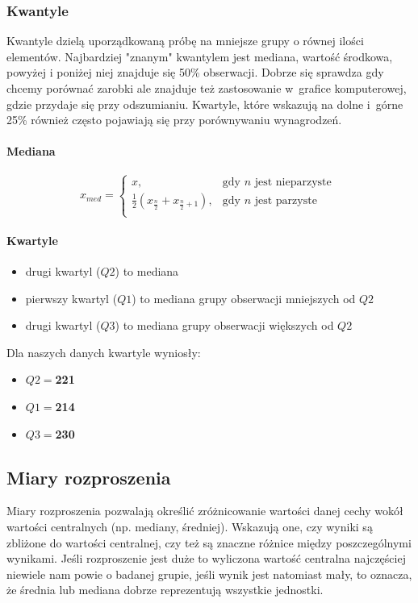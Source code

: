 \documentclass{article}
\theoremstyle{break}
\begin{document}
	\subsubsection*{Kwantyle}
	Kwantyle dzielą uporządkowaną próbę na mniejsze grupy o równej ilości elementów. Najbardziej "znanym" kwantylem jest mediana, wartość środkowa, powyżej i poniżej niej znajduje się 50\% obserwacji. Dobrze się sprawdza gdy chcemy porównać zarobki ale znajduje też zastosowanie w~grafice komputerowej, gdzie przydaje się przy odszumianiu. Kwartyle, które wskazują na dolne i~górne 25\% również często pojawiają się przy porównywaniu wynagrodzeń.
	\paragraph{Mediana}
	$$x_{med}=
	\begin{cases}
		x, &  \text{gdy $n$ jest nieparzyste }\\
		\frac{1}{2}(x_{\frac{n}{2}}+x_{\frac{n}{2}+1}), &  \text{gdy $n$ jest parzyste}\\
	\end{cases}$$
	\paragraph{Kwartyle}
	\begin{itemize}
		\item drugi kwartyl ($Q2$) to mediana
		\item pierwszy kwartyl ($Q1$) to mediana grupy obserwacji mniejszych od $Q2$
		\item drugi kwartyl ($Q3$) to mediana grupy obserwacji większych od $Q2$
	\end{itemize}
	Dla naszych danych kwartyle wyniosły:
	\begin{itemize}
		\item $Q2 = $\textbf{221}
		\item $Q1 = $\textbf{214}
		\item $Q3 = $\textbf{230}
	\end{itemize}
	\subsection{Miary rozproszenia}
	
	Miary rozproszenia pozwalają określić zróżnicowanie wartości danej cechy wokół wartości centralnych (np. mediany, średniej).  Wskazują one, czy wyniki są zbliżone do wartości centralnej, czy też są znaczne różnice między poszczególnymi wynikami. Jeśli rozproszenie jest duże to wyliczona wartość centralna najczęściej niewiele nam powie o badanej grupie, jeśli wynik jest natomiast mały, to oznacza, że średnia lub mediana dobrze reprezentują wszystkie jednostki.
	
\end{document}
